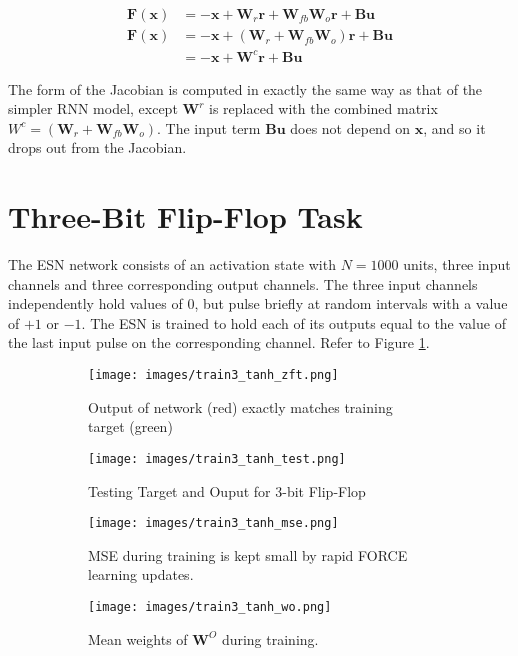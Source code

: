 \documentclass{article} %
\newcommand{\bf}[1]{\mathbf{#1}}
\newcommand{\x}{\bf{x}}
\begin{document}
\begin{align}
  \bf{F}(\x) &= -\x + \bf{W}_{r}\bf{r}+\bf{W}_{fb}{\bf{W}_o \bf{r}}+\bf{B}\bf{u} \\
  \bf{F}(\x) &= -\x + (\bf{W}_{r}+\bf{W}_{fb}\bf{W}_o)\bf{r}+\bf{B}\bf{u} \\
  &= -\x + \bf{W}^c\bf{r}+\bf{B}\bf{u}
\end{align}

The form of the Jacobian is computed in exactly the same way as that of the simpler RNN model, except $\bf{W}^r$ is replaced with the combined matrix $W^c = (\bf{W}_{r}+\bf{W}_{fb}\bf{W}_o)$. The input term $\bf{B}\bf{u}$ does not depend on $\x$, and so it drops out from the Jacobian.

\section{Three-Bit Flip-Flop Task}

The ESN network consists of an activation state with $N=1000$ units, three input channels and three corresponding output channels. The three input channels independently hold values of $0$, but pulse briefly at random intervals with a value of $+1$ or $-1$. The ESN is trained to hold each of its outputs equal to the value of the last input pulse on the corresponding channel. Refer to Figure \ref{fig:train_result}.


\begin{figure}
\centering
\begin{subfigure}{.5\textwidth}
  \centering
  \texttt{[image: images/train3\_tanh\_zft.png]}
  \caption{Output of network (red) exactly matches training target (green)}
\end{subfigure}%
\begin{subfigure}{.5\textwidth}
  \centering
  \texttt{[image: images/train3\_tanh\_test.png]}
  \caption{Testing Target and Ouput for 3-bit Flip-Flop}
\end{subfigure}
\begin{subfigure}{.5\textwidth}
  \centering
  \texttt{[image: images/train3\_tanh\_mse.png]}
  \caption{MSE during training is kept small by rapid FORCE learning updates.}
\end{subfigure}%
\begin{subfigure}{.5\textwidth}
  \centering
  \texttt{[image: images/train3\_tanh\_wo.png]}
  \caption{Mean weights of $\bf{W}^O$ during training.}
\end{subfigure}
\caption{}
\label{fig:train_result}
\end{figure}
\end{document}
